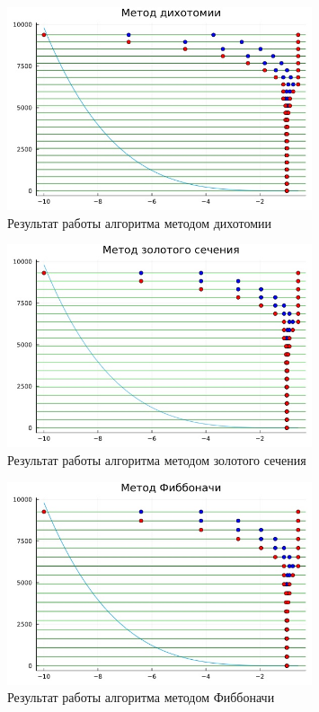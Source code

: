\documentclass[a4paper, 14pt]{extarticle}
\begin{document}
\begin{figure}[!htb]
	\centering
	\includegraphics[width=0.8\textwidth]{img1}
\caption{Результат работы алгоритма методом дихотомии}
\label{fig:img1}
\end{figure}


\begin{figure}[!htb]
	\centering
	\includegraphics[width=0.8\textwidth]{img2}
\caption{Результат работы алгоритма методом золотого сечения}
\label{fig:img2}
\end{figure}


\begin{figure}[!htb]
	\centering
	\includegraphics[width=0.8\textwidth]{img3}
\caption{Результат работы алгоритма методом Фиббоначи}
\label{fig:img3}
\end{figure}
\end{document}
